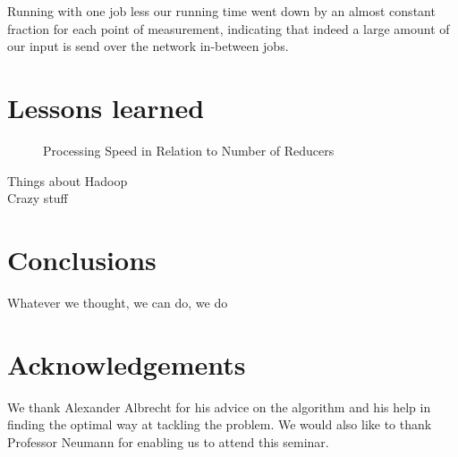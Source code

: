 \documentclass{llncs}
\begin{document}
Running with one job less our running time went down by an almost constant fraction 
for each point of measurement, indicating that indeed a large amount of our input 
is send over the network in-between jobs.
%
\section{Lessons learned}
\begin{figure}[tb]
  \begin{center}
  \end{center}
  \caption{Processing Speed in Relation to Number of Reducers}
  \label{fig:reducers}
\end{figure}
Things about Hadoop \\
Crazy stuff
\section{Conclusions}
Whatever we thought, we can do, we do
\section*{Acknowledgements} %
We thank Alexander Albrecht for his advice on the algorithm and his help in finding the optimal 
way at tackling the problem. We would also like to thank Professor Neumann for enabling us to 
attend this seminar.
%
\nocite{*}


\clearpage
\end{document}

